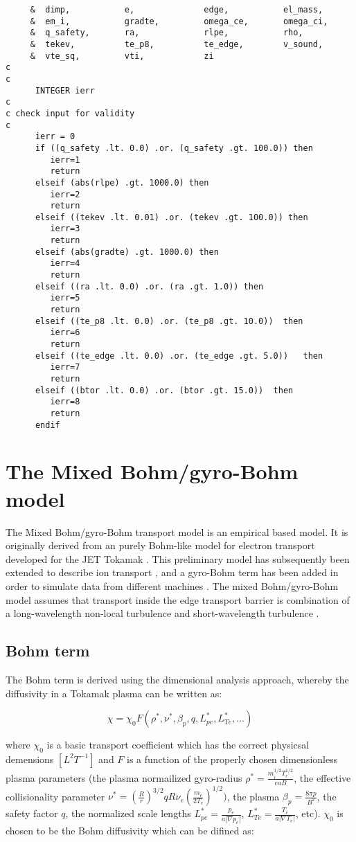 \documentclass{article}    %
\begin{document}
\begin{verbatim}
     &  dimp,           e,              edge,           el_mass,        
     &  em_i,           gradte,         omega_ce,       omega_ci,       
     &  q_safety,       ra,             rlpe,           rho,		
     &  tekev,          te_p8,          te_edge,        v_sound,        
     &  vte_sq,         vti,            zi	
c
c
      INTEGER ierr
c
c check input for validity
c
      ierr = 0
      if ((q_safety .lt. 0.0) .or. (q_safety .gt. 100.0)) then 
         ierr=1
         return
      elseif (abs(rlpe) .gt. 1000.0) then
         ierr=2
         return
      elseif ((tekev .lt. 0.01) .or. (tekev .gt. 100.0)) then
         ierr=3
         return
      elseif (abs(gradte) .gt. 1000.0) then
         ierr=4
         return
      elseif ((ra .lt. 0.0) .or. (ra .gt. 1.0)) then
         ierr=5
         return
      elseif ((te_p8 .lt. 0.0) .or. (te_p8 .gt. 10.0))  then
         ierr=6
         return
      elseif ((te_edge .lt. 0.0) .or. (te_edge .gt. 5.0))   then
         ierr=7
         return	
      elseif ((btor .lt. 0.0) .or. (btor .gt. 15.0))  then
         ierr=8
         return
      endif
\end{verbatim}

\section{The Mixed Bohm/gyro-Bohm model}

The Mixed Bohm/gyro-Bohm transport model is an empirical based model.  It is originally derived from an purely Bohm-like model for electron transport developed for the JET Tokamak \cite{tar94}.  This preliminary model has subsequently been extended to describe ion transport \cite{erb95}, and a gyro-Bohm term has been added in order to simulate data from different machines \cite{erb98}. The mixed Bohm/gyro-Bohm model assumes that transport inside the edge transport barrier is combination of a long-wavelength non-local turbulence and short-wavelength turbulence \cite{parail98}.  

\subsection{Bohm term}
The Bohm term is derived using the dimensional analysis approach, whereby the diffusivity in a Tokamak plasma can be written as:\hfill

\[ \chi = \chi_{0} F(\rho^*, \nu^*, \beta_p, q, L_{pe}^{*}, L_{Te}^{*},... )\]

where $\chi_{0}$ is a basic transport coefficient which has the correct physicsal demensions $[L^{2} T^{-1}]$ and $F$ is a function of the properly chosen dimensionless plasma parameters (the plasma normailized gyro-radius $\rho^* = \frac{m_{i}^{1/2} T_{e}^{1/2}}{eaB}$, the effective collisionality parameter $\nu^* = (\frac{R}{r})^{3/2} qR\nu_{e} (\frac{m_{e}}{2T_{e}})^{1/2})$, the plasma $\beta_p = \frac{8\pi p}{B^{2}}$, the safety factor $q$, the normalized scale lengths $L_{pe}^{*} = \frac{p_{e}}{a|\nabla p_{e}|}$, $L_{Te}^{*} = \frac{T_{e}}{a|\nabla T_{e}|}$, etc). 
$\chi_{0}$ is chosen to be the Bohm diffusivity which can be difined as:\hfill
\end{document}
